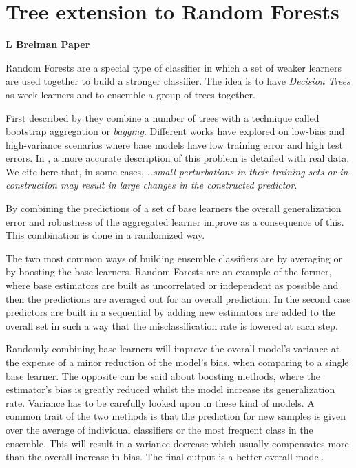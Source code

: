 \section{Tree extension to Random Forests}\label{section-randomForests}
\textbf{L Breiman Paper}\cite{breiman-randomforests}

Random Forests are a special type of classifier in which a set of weaker learners are used together to build a stronger classifier. The idea is to have \textit{Decision Trees} as week learners and to ensemble a group of trees together. 

 First described by \cite{HoFirstRandomForest} they combine a number of trees with a technique called bootstrap aggregation or \textit{bagging}. Different works have explored on low-bias and high-variance scenarios where base models have low training error and high test errors. In \cite{breiman-arcingclassifiers}, a more accurate description of this problem is detailed with  real data. We cite here that, in some cases, \textit{..small perturbations in their  training  sets  or  in  construction  may  result  in  large  changes  in  the  constructed  predictor}.

By combining the predictions of a set of base learners the overall generalization error and robustness of the aggregated learner improve as a consequence of this. This combination is done in a randomized way.

The two most common ways of building ensemble classifiers are by averaging or by boosting the base learners. Random Forests are an example of the former, where base estimators are built as uncorrelated or independent as possible and then the predictions are averaged out for an overall prediction. In the second case predictors are built in a sequential by adding new estimators are added to the overall set in such a way that the misclassification rate is lowered at each step.

Randomly combining base learners will improve the overall model's variance at the expense of a minor reduction of the model's bias, when comparing to a single base learner. The opposite can be said about boosting methods, where the estimator's bias is greatly reduced whilst the model increase its generalization rate. Variance has to be carefully looked upon in these kind of models. A common trait of the two methods is that the prediction for new samples is given over the average of individual classifiers or the most frequent class in the ensemble.   This will result in a variance decrease which usually compensates more than the overall increase in bias. The final output is a better overall model. 

